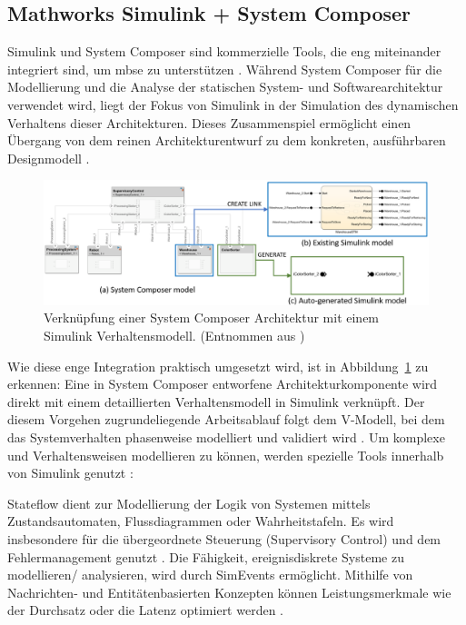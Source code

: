 \subsection{Mathworks Simulink + System Composer}
Simulink und System Composer sind kommerzielle Tools, die eng miteinander integriert sind, um \gls{mbse} zu unterstützen \cite{watkins2020system}.
Während System Composer für die Modellierung und die Analyse der statischen System- und Softwarearchitektur verwendet wird, liegt der Fokus von Simulink in der Simulation des dynamischen Verhaltens dieser Architekturen. Dieses Zusammenspiel ermöglicht einen Übergang von dem reinen Architekturentwurf zu dem konkreten, ausführbaren Designmodell \cite{chatterjee2020applications}.

\begin{figure}[h!]
  \centering
  \includegraphics[width=\textwidth]{figures/03StandDerTechnik/Simulink_System_Composer.png}
  \caption{Verknüpfung einer System Composer Architektur mit einem Simulink Verhaltensmodell. (Entnommen aus \cite{chatterjee2020applications})}
  \label{fig:simulink_system_composer}
\end{figure}

Wie diese enge Integration praktisch umgesetzt wird, ist in Abbildung~\ref{fig:simulink_system_composer} zu erkennen: Eine in System Composer entworfene Architekturkomponente wird direkt mit einem detaillierten Verhaltensmodell in Simulink verknüpft. Der diesem Vorgehen zugrundeliegende Arbeitsablauf folgt dem V-Modell, bei dem das Systemverhalten phasenweise modelliert und validiert wird \cite{The24}. Um komplexe und Verhaltensweisen modellieren zu können, werden spezielle Tools innerhalb von Simulink genutzt \cite{chatterjee2020applications}:

Stateflow dient zur Modellierung der Logik von Systemen mittels Zustandsautomaten, Flussdiagrammen oder Wahrheitstafeln. Es wird insbesondere für die übergeordnete Steuerung (Supervisory Control) und dem Fehlermanagement genutzt \cite{chatterjee2020applications}. Die Fähigkeit, ereignisdiskrete Systeme zu modellieren/ analysieren, wird durch SimEvents ermöglicht. Mithilfe von Nachrichten- und Entitätenbasierten Konzepten können Leistungsmerkmale wie der Durchsatz oder die Latenz optimiert werden \cite{chatterjee2020applications}.

